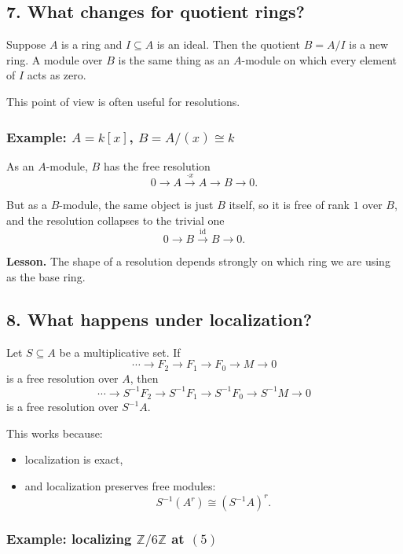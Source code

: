 \documentclass[12pt,a4paper]{article}
\theoremstyle{notespace}
\theoremstyle{definition}
\begin{document}
\subsection{7. What changes for quotient rings?}

Suppose \(A\) is a ring and \(I\subseteq A\) is an ideal. Then the quotient \(B=A/I\) is a new ring.
A module over \(B\) is the same thing as an \(A\)-module on which every element of \(I\) acts as zero.

This point of view is often useful for resolutions.

\subsubsection*{Example: \(A=k[x]\), \(B=A/(x)\cong k\)}

As an \(A\)-module, \(B\) has the free resolution
\[
0 \longrightarrow A \xrightarrow{\cdot x} A \longrightarrow B \longrightarrow 0.
\]

But as a \(B\)-module, the same object is just \(B\) itself, so it is free of rank \(1\) over \(B\), and the resolution collapses to the trivial one
\[
0 \longrightarrow B \xrightarrow{\mathrm{id}} B \longrightarrow 0.
\]

\textbf{Lesson.}
The shape of a resolution depends strongly on which ring we are using as the base ring.

\subsection{8. What happens under localization?}

Let \(S\subseteq A\) be a multiplicative set. If
\[
\cdots \longrightarrow F_2 \longrightarrow F_1 \longrightarrow F_0 \longrightarrow M \longrightarrow 0
\]
is a free resolution over \(A\), then
\[
\cdots \longrightarrow S^{-1}F_2 \longrightarrow S^{-1}F_1 \longrightarrow S^{-1}F_0 \longrightarrow S^{-1}M \longrightarrow 0
\]
is a free resolution over \(S^{-1}A\).

This works because:
\begin{itemize}
	\item localization is exact,
	\item and localization preserves free modules:
	\[
	S^{-1}(A^r)\cong (S^{-1}A)^r.
	\]
\end{itemize}

\subsubsection*{Example: localizing \(\mathbb Z/6\mathbb Z\) at \((5)\)}
\end{document}
